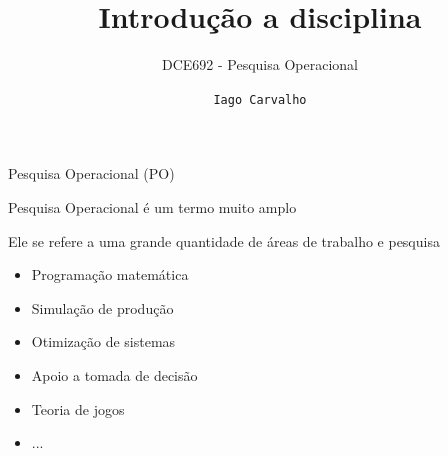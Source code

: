 \documentclass[compress]{beamer}
\title{Introdução a disciplina}
\subtitle{DCE692 - Pesquisa Operacional}
\author{\texttt{Iago Carvalho}}
\institute{\texttt{Departamento de Ciência da Computação}}
\begin{document}
\begin{frame}
\titlepage

\end{frame}


\begin{frame}{Pesquisa Operacional (PO)}

Pesquisa Operacional é um termo muito amplo 

\vspace{1cm}

Ele se refere a uma grande quantidade de áreas de trabalho e pesquisa

\begin{itemize}
    \item Programação matemática
    \item Simulação de produção
    \item Otimização de sistemas
    \item Apoio a tomada de decisão
    \item Teoria de jogos
    \item ...
\end{itemize}
\end{frame}

\end{document}
